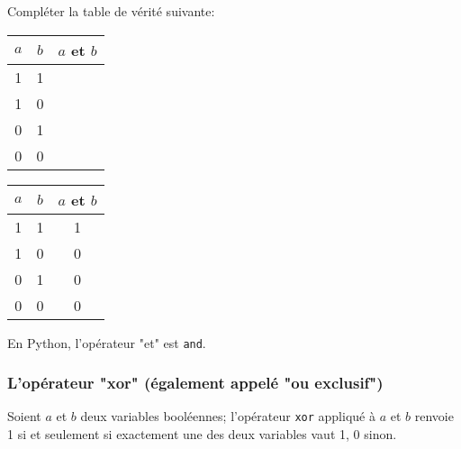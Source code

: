 \documentclass[12pt]{article}
\begin{document}
	\begin{MonExo}
		Compléter la table de vérité suivante:
		\\
		
		\begin{center}		
			\begin{tabular}{|c|c|c|}
				\hline
				$a$ & $b$ & $a$ et $b$ \\ \hline
				1 & 1 &  \\ \hline
				1 & 0 &  \\ \hline
				0 & 1 &  \\ \hline
				0 & 0 &  \\ \hline
			\end{tabular}
		\end{center}
	\end{MonExo}
	\begin{MaReponse}
		\begin{center}		
			\begin{tabular}{|c|c|c|}
				\hline
				$a$ & $b$ & $a$ et $b$ \\ \hline
				1 & 1 & 1 \\ \hline
				1 & 0 & 0 \\ \hline
				0 & 1 & 0 \\ \hline
				0 & 0 & 0 \\ \hline
			\end{tabular}
		\end{center}
	\end{MaReponse}

	
	En Python, l'opérateur "et" est \texttt{and}.
	
	\subsubsection*{L'opérateur "xor" (également appelé "ou exclusif")}
	Soient $a$ et $b$ deux variables booléennes; l'opérateur \texttt{xor} appliqué à $a$ et $b$ renvoie 1 si et seulement si exactement une des deux variables vaut 1, 0 sinon.
	
\end{document}
